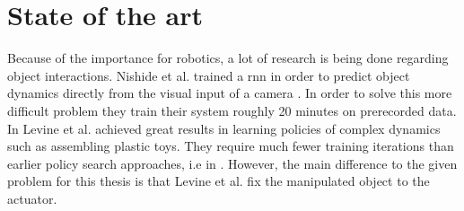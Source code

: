 \chapter{State of the art \label{chap:stateOfTheArt}}



Because of the importance for robotics, a lot of research is being done regarding object interactions. 
Nishide et al. trained a \gls{rnn} in order to predict object dynamics directly from the visual input of a camera \cite{nishide2008predicting}.
In order to solve this more difficult problem they train their system roughly 20 minutes on prerecorded data.
In \cite{levine2015learning} Levine et al. achieved great results in learning  policies of complex dynamics %
such as assembling plastic toys. They require much fewer training iterations than earlier policy search approaches, i.e in \cite{otherPolicySearchs}.
However, the main difference to the given problem for this thesis is that Levine et al. fix the manipulated object to the actuator.





